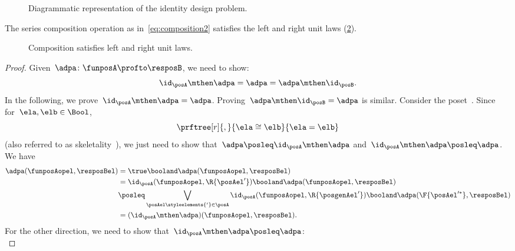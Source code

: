 \begin{figure}[h!]
    \centering
    \caption{Diagrammatic representation of the identity design problem.} \label{fig:identitydp}
\end{figure}

\begin{lemma}
    \label{lem:compositionunital}
    The series composition operation as in~\cref{eq:composition2} satisfies the left and right unit laws (\cref{fig:compositionunital}).
\end{lemma}
\begin{figure}[h!]
    \centering
    \caption{Composition satisfies left and right unit laws.} \label{fig:compositionunital}
\end{figure}
\begin{proof}
    Given~$\adpa\colon \funposA\profto \resposB$, we need to show:
    \begin{equation*}
        \id_\posA \mthen \adpa= \adpa = \adpa\mthen \id_\posB.
    \end{equation*}
    In the following, we prove~$\id_\posA \mthen \adpa = \adpa$.
    Proving~$\adpa\mthen \id_\posB=\adpa$ is similar.
    Consider the poset~\Bool.
    Since for~$\ela,\elb\in \Bool$,
    \begin{equation*}
        \prftree[r]{,}{\ela\cong \elb}{\ela=\elb}
    \end{equation*}
    (also referred to as skeletality~\cite{fong2019}), we just need to show that~$\adpa\posleq \id_\posA\mthen \adpa$ and~$\id_\posA\mthen \adpa\posleq \adpa$.
    We have
    \begin{equation*}
        \label{eq:dp_unit_1}
        \begin{aligned}
            \adpa(\funposAopel,\resposBel)&=\true \booland \adpa(\funposAopel,\resposBel)\\
            &= \id_\posA(\funposAopel,\R{\posAel'}) \booland \adpa(\funposAopel,\resposBel)\\
            &\posleq \bigvee_{\posAel\styleelements{'} \in \posA}\id_\posA(\funposAopel,\R{\posgenAel'})\booland \adpa(\F{\posAel'^*},\resposBel)\\
            &=(\id_\posA\mthen \adpa)(\funposAopel,\resposBel).
        \end{aligned}
    \end{equation*}
    For the other direction, we need to show that~$\id_\posA\mthen \adpa\posleq \adpa$:
    \begin{equation*}

\end{equation*}
\end{proof}
